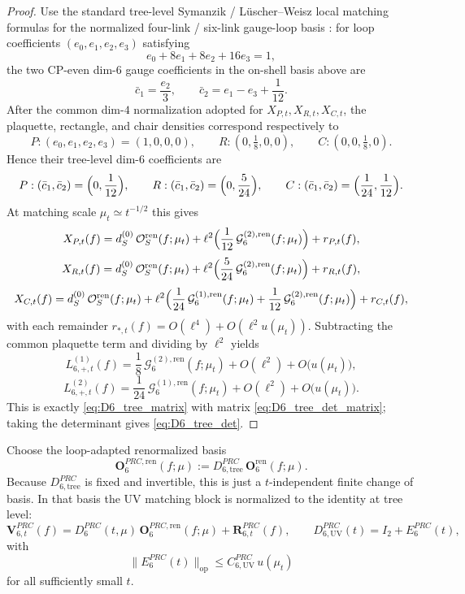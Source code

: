 \begin{proof}
Use the standard tree-level Symanzik / L\"uscher--Weisz local matching formulas for the normalized four-link / six-link gauge-loop basis \cite{LuscherWeisz1985,Husung2023}:
for loop coefficients $(e_0,e_1,e_2,e_3)$ satisfying
\[
e_0+8e_1+8e_2+16e_3=1,
\]
the two CP-even dim-$6$ gauge coefficients in the on-shell basis above are
\[
\bar c_1=\frac{e_2}{3},
\qquad
\bar c_2=e_1-e_3+\frac1{12}.
\]
After the common dim-$4$ normalization adopted for $X_{P,t},X_{R,t},X_{C,t}$, the plaquette, rectangle, and chair densities correspond respectively to
\[
P:(e_0,e_1,e_2,e_3)=(1,0,0,0),
\qquad
R:(0,\tfrac18,0,0),
\qquad
C:(0,0,\tfrac18,0).
\]
Hence their tree-level dim-$6$ coefficients are
\[
P:(\bar c_1,\bar c_2)=\Bigl(0,\frac1{12}\Bigr),
\qquad
R:(\bar c_1,\bar c_2)=\Bigl(0,\frac5{24}\Bigr),
\qquad
C:(\bar c_1,\bar c_2)=\Bigl(\frac1{24},\frac1{12}\Bigr).
\]
At matching scale $\mu_t\simeq t^{-1/2}$ this gives
\[
X_{P,t}(f)=d_S^{(0)}\,\mathcal O_S^{\mathrm{ren}}(f;\mu_t)+\ell^2\Bigl(\frac1{12}\,\mathcal G_{6}^{(2),\mathrm{ren}}(f;\mu_t)\Bigr)+r_{P,t}(f),
\]
\[
X_{R,t}(f)=d_S^{(0)}\,\mathcal O_S^{\mathrm{ren}}(f;\mu_t)+\ell^2\Bigl(\frac5{24}\,\mathcal G_{6}^{(2),\mathrm{ren}}(f;\mu_t)\Bigr)+r_{R,t}(f),
\]
\[
X_{C,t}(f)=d_S^{(0)}\,\mathcal O_S^{\mathrm{ren}}(f;\mu_t)+\ell^2\Bigl(\frac1{24}\,\mathcal G_{6}^{(1),\mathrm{ren}}(f;\mu_t)+\frac1{12}\,\mathcal G_{6}^{(2),\mathrm{ren}}(f;\mu_t)\Bigr)+r_{C,t}(f),
\]
with each remainder $r_{*,t}(f)=O(\ell^4)+O(\ell^2u(\mu_t))$.
Subtracting the common plaquette term and dividing by $\ell^2$ yields
\[
L_{6,+,t}^{(1)}(f)=\frac18\,\mathcal G_{6}^{(2),\mathrm{ren}}(f;\mu_t)+O(\ell^2)+O\!\big(u(\mu_t)\big),
\]
\[
L_{6,+,t}^{(2)}(f)=\frac1{24}\,\mathcal G_{6}^{(1),\mathrm{ren}}(f;\mu_t)+O(\ell^2)+O\!\big(u(\mu_t)\big).
\]
This is exactly \eqref{eq:D6_tree_matrix} with matrix \eqref{eq:D6_tree_det_matrix}; taking the determinant gives \eqref{eq:D6_tree_det}.
\end{proof}

Choose the loop-adapted renormalized basis
\[
\mathbf O_{6}^{PRC,\mathrm{ren}}(f;\mu)
:=
D_{6,\mathrm{tree}}^{PRC}\,\mathbf O_{6}^{\mathrm{ren}}(f;\mu).
\]
Because $D_{6,\mathrm{tree}}^{PRC}$ is fixed and invertible, this is just a $t$-independent finite change of basis.
In that basis the UV matching block is normalized to the identity at tree level:
\[
\mathbf V_{6,t}^{PRC}(f)
=
D_6^{PRC}(t,\mu)\,\mathbf O_{6}^{PRC,\mathrm{ren}}(f;\mu)+\mathbf R_{6,t}^{PRC}(f),
\qquad
D_{6,\mathrm{UV}}^{PRC}(t)=I_2+E_{6}^{PRC}(t),
\]
with
\[
\|E_{6}^{PRC}(t)\|_{\mathrm{op}}\le C_{6,\mathrm{UV}}^{PRC}\,u(\mu_t)
\]
for all sufficiently small $t$.

